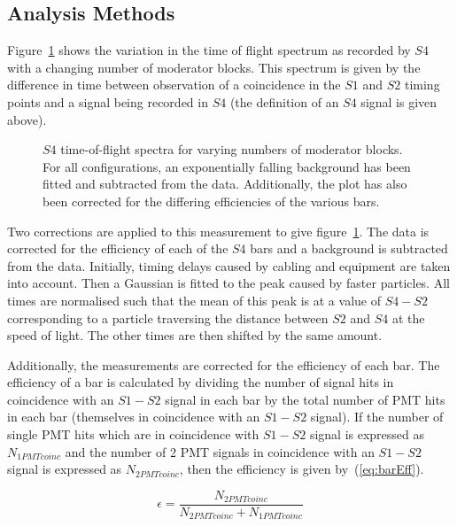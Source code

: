 \subsection{Analysis Methods}

	Figure~\ref{fig:s4tof} shows the variation in the time of flight spectrum as recorded by $S4$ with a changing number of moderator blocks.
	This spectrum is given by the difference in time between observation of a coincidence in the $S1$ and $S2$ timing points and a signal being recorded in $S4$ (the definition of an $S4$ signal is given above).
	
	\begin{figure}[h]
		\begin{adjustbox}{max totalsize={.8\textwidth}{.5\textheight},center}
			
		\end{adjustbox}
		\caption{$S4$ time-of-flight spectra for varying numbers of moderator blocks. For all configurations, an exponentially falling background has been fitted and subtracted from the data. Additionally, the plot has also been corrected for the differing efficiencies of the various bars.}
		\label{fig:s4tof}	
	\end{figure}

	Two corrections are applied to this measurement to give figure~\ref{fig:s4tof}. 
	The data is corrected for the efficiency of each of the $S4$ bars and a background is subtracted from the data.
	Initially, timing delays caused by cabling and equipment are taken into account.
	Then a Gaussian is fitted to the peak caused by faster particles.
	All times are normalised such that the mean of this peak is at a value of $S4 - S2$ corresponding to a particle traversing the distance between $S2$ and $S4$ at the speed of light. 
	The other times are then shifted by the same amount.
	
	Additionally, the measurements are corrected for the efficiency of each bar. 
	The efficiency of a bar is calculated by dividing the number of signal hits in coincidence with an $S1-S2$ signal in each bar by the total number of PMT hits in each bar (themselves in coincidence with an $S1-S2$ signal). 
	If the number of single PMT hits which are in coincidence with $S1-S2$ signal is expressed as $N_{1PMTcoinc}$ and the number of 2 PMT signals in coincidence with an $S1-S2$ signal is expressed as $N_{2PMTcoinc}$, then the efficiency is given by~(\ref{eq:barEff}).
	
	\begin{equation}
		\epsilon = \frac{N_{2PMTcoinc}}{N_{2PMTcoinc}+N_{1PMTcoinc}}
		\label{eq:barEff}
	\end{equation}
	
